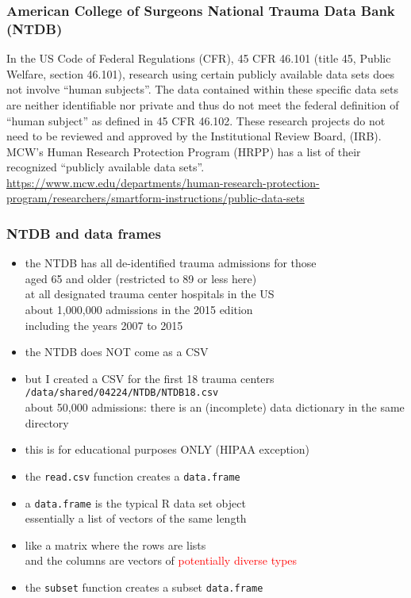\documentclass[11pt,pdftex,dvipsnames,usenames,helvetica]{beamer}
\begin{document}
\begin{frame}
\frametitle{American College of Surgeons National Trauma Data Bank (NTDB)}

In the US Code of Federal Regulations (CFR), 45 CFR 46.101 (title 45,
Public Welfare, section 46.101),
research using certain publicly available data sets does not involve
``human subjects''. The data contained within these specific data sets
are neither identifiable nor private and thus do not meet the federal
definition of ``human subject'' as defined in 45 CFR 46.102.  These
research projects do not need to be reviewed and approved by the
Institutional Review Board, (IRB). MCW's Human Research Protection
Program (HRPP) has a list of their recognized ``publicly available data sets''.\\
\url{https://www.mcw.edu/departments/human-research-protection-program/researchers/smartform-instructions/public-data-sets}
\end{frame}

\begin{frame}
\frametitle{NTDB and data frames}

\begin{itemize}
\item the NTDB has all de-identified trauma admissions for those\\
 aged 65 and older (restricted to 89 or less here)\\
at all designated trauma center hospitals in the US\\
about 1,000,000 admissions in the 2015 edition\\
including the years 2007 to 2015
\item the NTDB does NOT come as a CSV
\item but I created a CSV for the first 18 trauma centers\\
{\tt /data/shared/04224/NTDB/NTDB18.csv}\\
about 50,000 admissions:
there is an (incomplete) data dictionary in the same directory
\item this is for educational purposes ONLY (HIPAA exception)
\item the {\tt read.csv} function creates a {\tt data.frame}
\item a {\tt data.frame} is the typical R data set object\\ 
essentially a list of vectors of the same length
\item like a matrix where the rows are lists\\
and the columns are vectors of \textcolor{red}{potentially diverse types}
\item the {\tt subset} function creates a subset {\tt data.frame} 
\end{itemize}
\end{frame}
\end{document}
